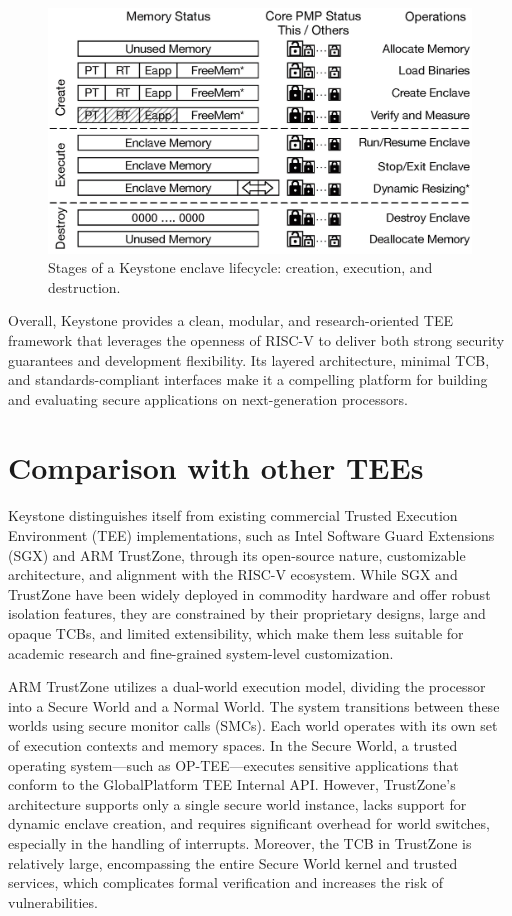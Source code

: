 \begin{figure}[htbp]
\centering
\includegraphics[width=0.9\linewidth]{figures/enclave_lifecycle.png}
\caption{Stages of a Keystone enclave lifecycle: creation, execution, and destruction.}
\label{fig:enclave_lifecycle}
\end{figure}

Overall, Keystone provides a clean, modular, and research-oriented TEE framework that leverages the openness of RISC-V to deliver both strong security guarantees and development flexibility. Its layered architecture, minimal TCB, and standards-compliant interfaces make it a compelling platform for building and evaluating secure applications on next-generation processors.

\section{Comparison with other TEEs}

Keystone distinguishes itself from existing commercial Trusted Execution Environment (TEE) implementations, such as Intel Software Guard Extensions (SGX) and ARM TrustZone, through its open-source nature, customizable architecture, and alignment with the RISC-V ecosystem. While SGX and TrustZone have been widely deployed in commodity hardware and offer robust isolation features, they are constrained by their proprietary designs, large and opaque TCBs, and limited extensibility, which make them less suitable for academic research and fine-grained system-level customization.

ARM TrustZone utilizes a dual-world execution model, dividing the processor into a Secure World and a Normal World. The system transitions between these worlds using secure monitor calls (SMCs). Each world operates with its own set of execution contexts and memory spaces. In the Secure World, a trusted operating system—such as OP-TEE—executes sensitive applications that conform to the GlobalPlatform TEE Internal API. However, TrustZone’s architecture supports only a single secure world instance, lacks support for dynamic enclave creation, and requires significant overhead for world switches, especially in the handling of interrupts. Moreover, the TCB in TrustZone is relatively large, encompassing the entire Secure World kernel and trusted services, which complicates formal verification and increases the risk of vulnerabilities.


